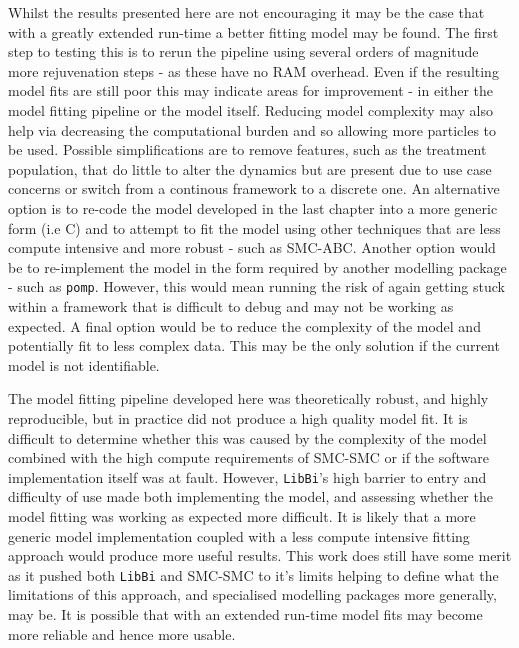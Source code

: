 \documentclass[11pt,twoside]{bristolthesis}
\begin{document}
  Whilst the results presented here are not encouraging it may be the case that with a greatly extended run-time a better fitting model may be found. The first step to testing this is to rerun the pipeline using several orders of magnitude more rejuvenation steps - as these have no RAM overhead. Even if the resulting model fits are still poor this may indicate areas for improvement - in either the model fitting pipeline or the model itself. Reducing model complexity may also help via decreasing the computational burden and so allowing more particles to be used. Possible simplifications are to remove features, such as the treatment population, that do little to alter the dynamics but are present due to use case concerns or switch from a continous framework to a discrete one. An alternative option is to re-code the model developed in the last chapter into a more generic form (i.e C) and to attempt to fit the model using other techniques that are less compute intensive and more robust - such as SMC-ABC. Another option would be to re-implement the model in the form required by another modelling package - such as \texttt{pomp}. However, this would mean running the risk of again getting stuck within a framework that is difficult to debug and may not be working as expected. A final option would be to reduce the complexity of the model and potentially fit to less complex data. This may be the only solution if the current model is not identifiable.
  
  The model fitting pipeline developed here was theoretically robust, and highly reproducible, but in practice did not produce a high quality model fit. It is difficult to determine whether this was caused by the complexity of the model combined with the high compute requirements of SMC-SMC or if the software implementation itself was at fault. However, \texttt{LibBi}'s high barrier to entry and difficulty of use made both implementing the model, and assessing whether the model fitting was working as expected more difficult. It is likely that a more generic model implementation coupled with a less compute intensive fitting approach would produce more useful results. This work does still have some merit as it pushed both \texttt{LibBi} and SMC-SMC to it's limits helping to define what the limitations of this approach, and specialised modelling packages more generally, may be. It is possible that with an extended run-time model fits may become more reliable and hence more usable.
  
\end{document}
